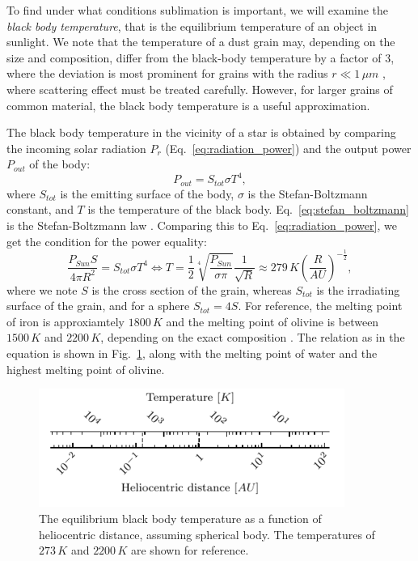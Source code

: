 To find under what conditions sublimation is important, we will examine the \textit{black body temperature}, that is the equilibrium temperature of an object in sunlight. We note that the temperature of a dust grain may, depending on the size and composition, differ from the black-body temperature by a factor of $3$, where the deviation is most prominent for grains with the radius $r \ll 1 \, \si{\mu m}$ \citep{myrvang2018temperature}, where scattering effect must be treated carefully. However, for larger grains of common material, the black body temperature is a useful approximation. 

The black body temperature in the vicinity of a star is obtained by comparing the incoming solar radiation $P_{r}$ (Eq.~\ref{eq:radiation_power}) and the output power $P_{out}$ of the body:
\begin{equation}
    P_{out} = S_{tot} \sigma T^4,
    \label{eq:stefan_boltzmann}
\end{equation}
where $S_{tot}$ is the emitting surface of the body, $\sigma$ is the Stefan-Boltzmann constant, and $T$ is the temperature of the black body. Eq.~\ref{eq:stefan_boltzmann} is the Stefan-Boltzmann law \citep{stefan1879uber,boltzmann1884ableitnung}. Comparing this to Eq.~\ref{eq:radiation_power}, we get the condition for the power equality:
\begin{equation}
    \frac{P_{Sun} S}{4 \pi R^2} = S_{tot} \sigma T^4 \Leftrightarrow T =  \frac{1}{2} \sqrt[4]{\frac{P_{Sun}}{\sigma \pi}} \frac{1}{\sqrt{R}} \approx 279 \, \si{K} \left(\frac{R}{\si{AU}}\right)^{-\frac{1}{2}}, 
\end{equation}
where we note $S$ is the cross section of the grain, whereas $S_{tot}$ is the irradiating surface of the grain, and for a sphere $S_{tot} = 4S$. For reference, the melting point of iron is approxiamtely $1800 \, \si{K}$ and the melting point of olivine is between $1500 \, \si{K}$ and $2200 \, \si{K}$, depending on the exact composition \citep{liu1975melting,pinti2015olivine}. The relation as in the equation is shown in Fig.~\ref{fig:black_body_temperature}, along with the melting point of water and the highest melting point of olivine.

\begin{figure}[h]
 	\centering
 	\includegraphics[width=10cm]{figures/distance_temperature_ruler.pdf}
 	\caption{The equilibrium black body temperature as a function of heliocentric distance, assuming spherical body. The temperatures of $273 \, \si{K}$ and $2200 \, \si{K}$ are shown for reference.}
 	\label{fig:black_body_temperature}
\end{figure}

